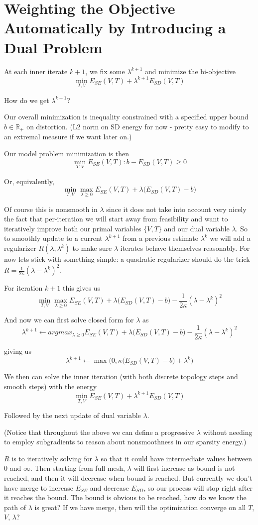 \section{Weighting the Objective Automatically by Introducing a Dual Problem}

At each inner iterate $k+1$, we fix some $\lambda^{k+1}$ and minimize the bi-objective 
\[ \min_{T,V} E_{SE}(V,T) + \lambda^{k+1} E_{SD}(V,T) \]

How do we get $\lambda^{k+1}$? 

Our overall minimization is inequality constrained with a specified upper bound $b \in \mathbb{R}_+$ on distortion. (L2 norm on SD  energy for now - pretty easy to modify to an extremal measure if we want later on.)

Our model problem minimization is then 
\[ \min_{T,V} E_{SE}(V,T) :  b - E_{SD}(V,T) \geq 0 \]

Or, equivalently,
\[ \min_{T,V} \max_{\lambda \geq 0} E_{SE}(V,T) + \lambda \big( E_{SD}(V,T) - b\big) \]

Of course this is nonsmooth in $\lambda$ since it does not take into account very nicely the fact that per-iteration we will start away from feasibility and want to iteratively improve both our primal variables $\{V,T\}$ and our dual variable $\lambda$.  So to smoothly update to a current $\lambda^{k+1}$ from a previous estimate $\lambda^k$ we will add a regularizer $R(\lambda,\lambda^k)$ to make sure $\lambda$ iterates behave themselves reasonably. For now lets stick with something simple: a quadratic regularizer should do the trick  $R =\frac{1}{2\kappa} (\lambda- \lambda^k)^2$. 

For iteration $k+1$ this gives us 
\[ \min_{T,V} \max_{\lambda \geq 0} E_{SE}(V,T) + \lambda \big( E_{SD}(V,T) - b\big) - \frac{1}{2\kappa} (\lambda- \lambda^k)^2 \]

And now we can first solve closed form for $\lambda$ as 
\[ \lambda^{k+1} \leftarrow argmax_{\lambda \geq 0} E_{SE}(V,T) + \lambda \big( E_{SD}(V,T) - b\big) - \frac{1}{2\kappa} (\lambda- \lambda^k)^2 \]

giving us 
\[ \lambda^{k+1} \leftarrow \max\big(0,\kappa \big( E_{SD}(V,T) -b \big) + \lambda^k\big) \]

We then can solve the inner iteration (with both discrete topology steps and smooth steps) with the energy 
\[ \min_{T,V}  E_{SE}(V,T) + \lambda^{k+1}  E_{SD}(V,T) \]

Followed by the next update of dual variable $\lambda$.

(Notice that throughout the above we can define a progressive $\lambda$ without needing to employ subgradients to reason about nonsmoothness in our sparsity energy.)

$R$ is to iteratively solving for $\lambda$ so that it could have intermediate values between $0$ and $\infty$. Then starting from full mesh, $\lambda$ will first increase as bound is not reached, and then it will decrease when bound is reached. But currently we don't have merge to increase $E_{SE}$ and decrease $E_{SD}$, so our process will stop right after it reaches the bound. The bound is obvious to be reached, how do we know the path of $\lambda$ is great? If we have merge, then will the optimization converge on all $T$, $V$, $\lambda$?